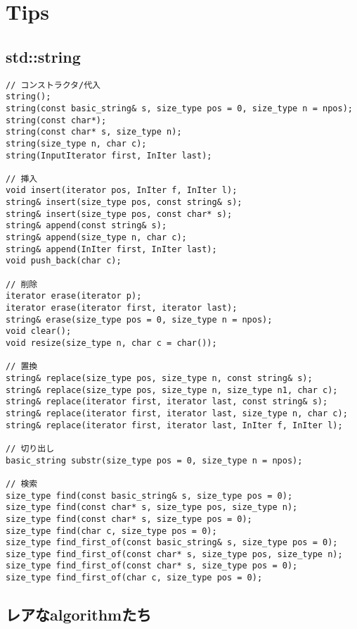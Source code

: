 \section{Tips}

\subsection{std::string}

\begin{lstlisting}
// コンストラクタ/代入
string();
string(const basic_string& s, size_type pos = 0, size_type n = npos);
string(const char*);
string(const char* s, size_type n);
string(size_type n, char c);
string(InputIterator first, InIter last);

// 挿入
void insert(iterator pos, InIter f, InIter l);
string& insert(size_type pos, const string& s);
string& insert(size_type pos, const char* s);
string& append(const string& s);
string& append(size_type n, char c);
string& append(InIter first, InIter last);
void push_back(char c);

// 削除
iterator erase(iterator p);
iterator erase(iterator first, iterator last);
string& erase(size_type pos = 0, size_type n = npos);
void clear();
void resize(size_type n, char c = char());

// 置換
string& replace(size_type pos, size_type n, const string& s);
string& replace(size_type pos, size_type n, size_type n1, char c);
string& replace(iterator first, iterator last, const string& s);
string& replace(iterator first, iterator last, size_type n, char c);
string& replace(iterator first, iterator last, InIter f, InIter l);

// 切り出し
basic_string substr(size_type pos = 0, size_type n = npos);

// 検索
size_type find(const basic_string& s, size_type pos = 0);
size_type find(const char* s, size_type pos, size_type n);
size_type find(const char* s, size_type pos = 0);
size_type find(char c, size_type pos = 0);
size_type find_first_of(const basic_string& s, size_type pos = 0);
size_type find_first_of(const char* s, size_type pos, size_type n);
size_type find_first_of(const char* s, size_type pos = 0);
size_type find_first_of(char c, size_type pos = 0);
\end{lstlisting}


\subsection{レアなalgorithmたち}

